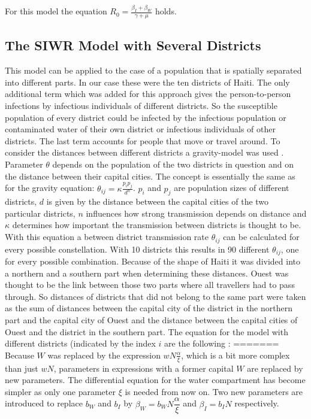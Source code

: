 \documentclass[11pt]{article}
\begin{document}
For this model the equation $ R_{0}=\frac{\beta_{I}+\beta_{W}}{\gamma+\mu} $ holds.

\subsection{The SIWR Model with Several Districts}
This model can be applied to the case of a population  that is spatially separated into different parts. In our case these were the ten districts of Haiti. The only additional term which was added for this approach gives the person-to-person infections by infectious individuals of different districts. So the susceptible population of every district could be infected by the infectious population or contaminated water of their own district or infectious individuals of other districts. The last term accounts for people that move or travel around. To consider the distances between different districts a gravity-model was used \cite{tuite:2011}. Parameter $ \theta $ depends on the population of the two districts in question and on the distance between their capital cities. The concept is essentially the same as for the gravity equation: $ \theta_{ij}=\kappa\frac{p_{i}p_{j}}{d^{n}} $. $ p_{i} $ and $ p_{j} $ are population sizes of different districts, $ d $ is given by the distance between the capital cities of the two particular districts, $ n $ influences how strong transmission depends on distance and $ \kappa $ determines how important the transmission between districts is thought to be. With this equation a between district transmission rate $ \theta_{ij} $ can be calculated for every possible constellation. With 10 districts this results in 90 different $ \theta_{ij} $, one for every possible combination. Because of the shape of Haiti it was divided into a northern and a southern part when determining these distances. Ouest was thought to be the link between those two parts where all travellers had to pass through. So distances of districts that did not belong to the same part were taken as the sum of distances between the capital city of the district in the northern part and the capital city of Ouest and the distance between the capital cities of Ouest and the district in the southern part.
The equation for the model with different districts (indicated by the index $ i $ are the following \cite{tuite:2011}:
=======
Because $ W $ was replaced by the expression $ wN\frac{\alpha}{\xi} $, which is a bit more complex than just $ wN $, parameters in expressions with a former capital $ W $ are replaced by new parameters. The differential equation for the water compartment has become simpler as only one parameter $ \xi $ is needed from now on. Two new parameters are introduced to replace $ b_{W} $ and $ b_{I} $ by $ \beta_{W}=b_{W}N\dfrac{\alpha}{\xi} $ and $ \beta_{I}=b_{I}N $ respectively.
\end{document}
